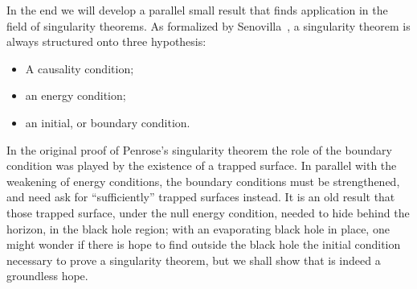 In the end we will develop a parallel small result that finds application in the field of singularity theorems. As formalized by Senovilla~\cite[]{senovilla1998singularity}, a singularity theorem is always structured onto three hypothesis:
\begin{itemize}
    \item[\ding{99}] A causality condition; 
    \item[\ding{99}] an energy condition;
    \item[\ding{99}] an initial, or boundary condition.
\end{itemize}
In the original proof of Penrose's singularity theorem the role of the boundary condition was played by the existence of a trapped surface. In parallel with the weakening of energy conditions, the boundary conditions must be strengthened, and need ask for ``sufficiently'' trapped surfaces instead. It is an old result that those trapped surface, under the null energy condition, needed to hide behind the horizon, in the black hole region; with an evaporating black hole in place, one might wonder if there is hope to find outside the black hole the initial condition necessary to prove a singularity theorem, but we shall show that is indeed a groundless hope.